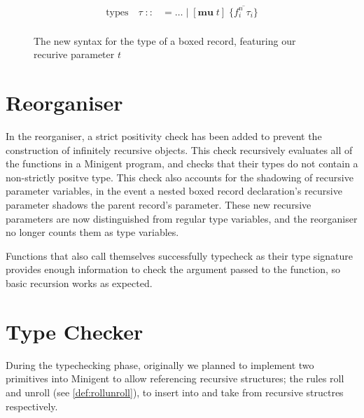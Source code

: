 \begin{figure}
    \centering
    \begin{align*}
        \text{types}\quad \tau\;
            ::&= \dots\; |\; [\textbf{mu}\; t]\; \{ \overline{f_i^n\; \tau_i} \} \\
    \end{align*}
    \caption{The new syntax for the type of a boxed record, featuring our recurive parameter $t$}
    \label{fig:recursivetypegrammar}
\end{figure}


\section{Reorganiser}

In the reorganiser, a strict positivity check has been added to prevent the construction of infinitely
recursive objects. This check recursively evaluates all of the functions in a Minigent program, and
checks that their types do not contain a non-strictly positve type. This check also accounts for the
shadowing of recursive parameter variables, in the event a nested boxed record declaration's recursive
parameter shadows the parent record's parameter. These new recursive parameters are now distinguished from
regular type variables, and the reorganiser no longer counts them as type variables.

Functions that also call themselves successfully typecheck as their type signature provides enough information
to check the argument passed to the function, so basic recursion works as expected.


\section{Type Checker}
\label{sec:typecheckingprogress}

During the typechecking phase, originally we planned to implement two primitives into Minigent to allow referencing
recursive structures; the rules \textsf{roll} and \textsf{unroll} (see \autoref{def:rollunroll}), to insert into and take from recursive structres respectively.

